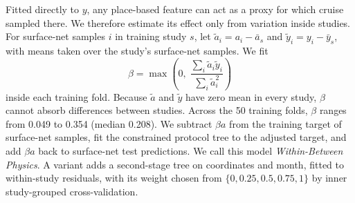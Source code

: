 \documentclass[12pt,a4paper]{report}
\begin{document}
Fitted directly to $y$, any place-based feature can act as a proxy for which cruise sampled there. We therefore estimate its effect only from variation inside studies. For surface-net samples $i$ in training study $s$, let $\tilde{a}_i=a_i-\bar{a}_s$ and $\tilde{y}_i=y_i-\bar{y}_s$, with means taken over the study's surface-net samples. We fit
\begin{equation}
\beta=\max\!\left(0,\;\frac{\sum_i\tilde{a}_i\tilde{y}_i}{\sum_i\tilde{a}_i^2}\right)
\end{equation}
inside each training fold. Because $\tilde{a}$ and $\tilde{y}$ have zero mean in every study, $\beta$ cannot absorb differences between studies. Across the 50 training folds, $\beta$ ranges from 0.049 to 0.354 (median 0.208). We subtract $\beta a$ from the training target of surface-net samples, fit the constrained protocol tree to the adjusted target, and add $\beta a$ back to surface-net test predictions. We call this model \emph{Within-Between Physics}. A variant adds a second-stage tree on coordinates and month, fitted to within-study residuals, with its weight chosen from $\{0, 0.25, 0.5, 0.75, 1\}$ by inner study-grouped cross-validation.
\end{document}
